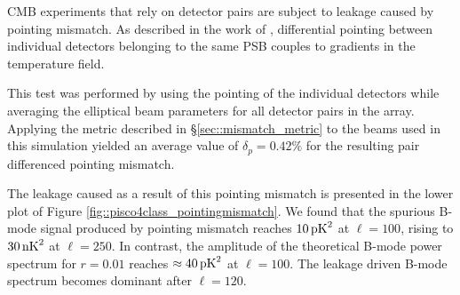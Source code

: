 \documentclass[a4paper,11pt]{article}
\begin{document}
CMB experiments that rely on detector pairs are subject to leakage caused by pointing mismatch. As described in the work of \cite{2007MNRAS.376.1767O}, differential pointing between individual detectors belonging to the same PSB couples to gradients in the temperature field.

This test was performed by using the pointing of the individual detectors while averaging the elliptical beam parameters for all detector pairs in the array. Applying the metric described in \S\ref{sec::mismatch_metric} to the beams used in this simulation yielded an average value of $\delta_p = 0.42\%$ for the resulting pair differenced pointing mismatch. 

The leakage caused as a result of this pointing mismatch is presented in the lower plot of Figure \ref{fig::pisco4class_pointingmismatch}. We found that the spurious B-mode signal produced by pointing mismatch reaches $10 \, \rm{pK}^2$ at $\ell=100$, rising to $30 \, \rm{nK}^2$ at $\ell=250$. In contrast, the amplitude of the theoretical B-mode power spectrum for $r=0.01$ reaches $\approx 40 \, \rm{pK}^2$ at $\ell=100$. The leakage driven B-mode spectrum becomes dominant after $\ell=120$.

\end{document}

